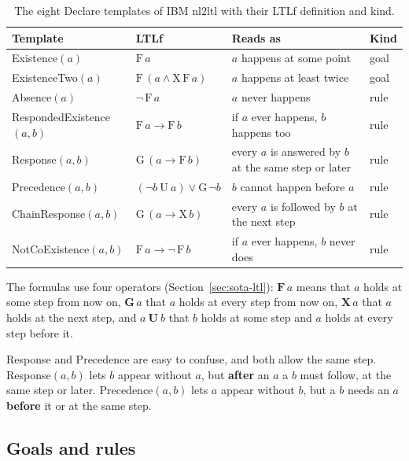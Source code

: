 \documentclass[11pt,english,listoffigures,listoftables]{tfgetsinf}
\begin{document}
\begin{table}[H]
\centering
\footnotesize
\renewcommand{\arraystretch}{1.2}
\begin{tabular}{@{}ll>{\raggedright\arraybackslash}p{4.6cm}l@{}}
\toprule
\textbf{Template} & \textbf{LTLf} & \textbf{Reads as} & \textbf{Kind} \\ \midrule
Existence$(a)$ & $\mathrm{F}\,a$ & $a$ happens at some point & goal \\
ExistenceTwo$(a)$ & $\mathrm{F}\,(a \land \mathrm{X}\,\mathrm{F}\,a)$ & $a$ happens at least twice & goal \\
Absence$(a)$ & $\neg\,\mathrm{F}\,a$ & $a$ never happens & rule \\
RespondedExistence$(a,b)$ & $\mathrm{F}\,a \rightarrow \mathrm{F}\,b$ & if $a$ ever happens, $b$ happens too & rule \\
Response$(a,b)$ & $\mathrm{G}\,(a \rightarrow \mathrm{F}\,b)$ & every $a$ is answered by $b$ at the same step or later & rule \\
Precedence$(a,b)$ & $(\neg b\ \mathrm{U}\ a) \lor \mathrm{G}\,\neg b$ & $b$ cannot happen before $a$ & rule \\
ChainResponse$(a,b)$ & $\mathrm{G}\,(a \rightarrow \mathrm{X}\,b)$ & every $a$ is followed by $b$ at the next step & rule \\
NotCoExistence$(a,b)$ & $\mathrm{F}\,a \rightarrow \neg\,\mathrm{F}\,b$ & if $a$ ever happens, $b$ never does & rule \\ \bottomrule
\end{tabular}
\caption{The eight Declare templates of IBM nl2ltl with their LTLf definition and kind.}
\label{tab:templates}
\end{table}

The formulas use four operators (Section~\ref{sec:sota-ltl}): $\textbf{F}\,a$ means that $a$ holds at some step from now on, $\textbf{G}\,a$ that $a$ holds at every step from now on, $\textbf{X}\,a$ that $a$ holds at the next step, and $a\ \textbf{U}\ b$ that $b$ holds at some step and $a$ holds at every step before it.

Response and Precedence are easy to confuse, and both allow the same step. Response$(a,b)$ lets $b$ appear without $a$, but \textbf{after} an $a$ a $b$ must follow, at the same step or later. Precedence$(a,b)$ lets $a$ appear without $b$, but a $b$ needs an $a$ \textbf{before} it or at the same step.

\subsection{Goals and rules}
\end{document}
